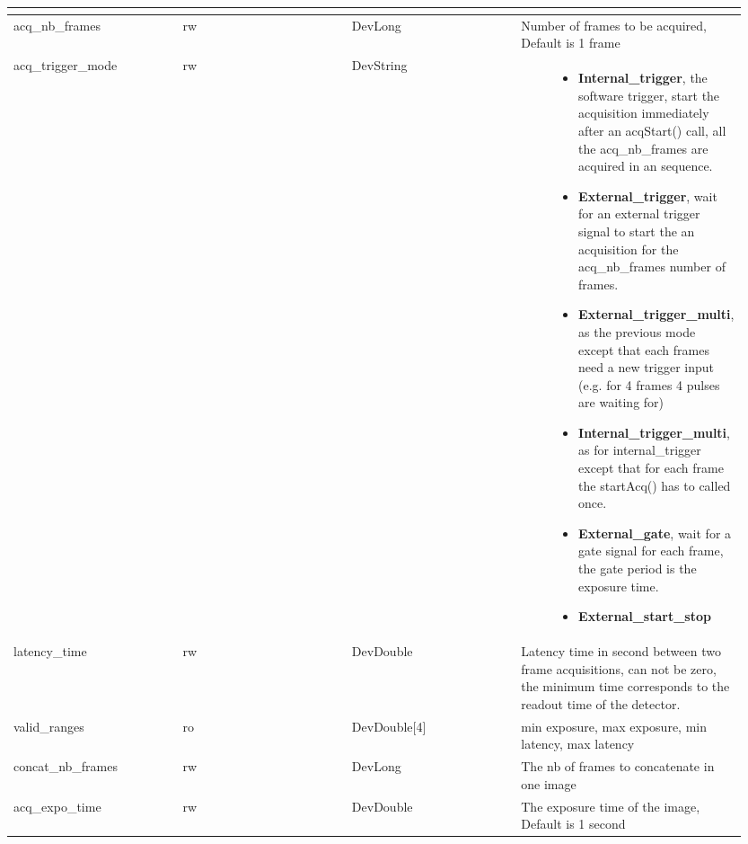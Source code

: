 \documentclass[letterpaper,10pt,english]{sphinxmanual}
\begin{document}
\begin{longtable}{|p{0.237\linewidth}|p{0.237\linewidth}|p{0.237\linewidth}|p{0.237\linewidth}|}
\begin{description}
\begin{itemize}
\end{itemize}

\end{description}
\\
\hline
acq\_nb\_frames
 & 
rw
 & 
DevLong
 & 
Number of frames to be acquired, Default is 1 frame
\\
\hline
acq\_trigger\_mode
 & 
rw
 & 
DevString
 & \begin{description}
\item[{Trigger mode:}] \leavevmode\begin{itemize}
\item {} 
\textbf{Internal\_trigger}, the software trigger,
start the acquisition immediately after an acqStart() call,
all the acq\_nb\_frames are acquired in an sequence.

\item {} 
\textbf{External\_trigger}, wait for an external trigger signal
to start the an acquisition for the acq\_nb\_frames number
of frames.

\item {} 
\textbf{External\_trigger\_multi}, as the previous mode except
that each frames need a new trigger input
(e.g. for 4 frames 4 pulses are waiting for)

\item {} 
\textbf{Internal\_trigger\_multi}, as for internal\_trigger except
that for each frame the startAcq() has to called once.

\item {} 
\textbf{External\_gate}, wait for a gate signal for each frame,
the gate period is the exposure time.

\item {} 
\textbf{External\_start\_stop}

\end{itemize}

\end{description}
\\
\hline
latency\_time
 & 
rw
 & 
DevDouble
 & 
Latency time in second between two frame acquisitions,
can not be zero, the minimum time corresponds to the
readout time of the detector.
\\
\hline
valid\_ranges
 & 
ro
 & 
DevDouble{[}4{]}
 & 
min exposure, max exposure, min latency, max latency
\\
\hline
concat\_nb\_frames
 & 
rw
 & 
DevLong
 & 
The nb of frames to concatenate in one image
\\
\hline
acq\_expo\_time
 & 
rw
 & 
DevDouble
 & 
The exposure time of the image, Default is 1 second
\\
\hline


\end{longtable}
\end{document}

